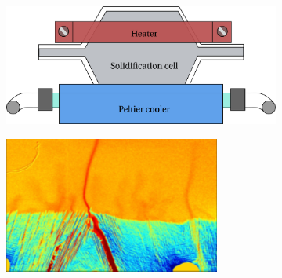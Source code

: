 \begin{figure}[htbp]
\centering
  \begin{subfigure}{0.5\textwidth}
    \centering
	\includegraphics[width=\textwidth]{Chapter4/Graphics/freckle_exp/setup.pdf}
	\caption{}
    \label{fig:experimental_setup}
  \end{subfigure}
  \begin{subfigure}{0.5\textwidth}
    \centering
	\includegraphics[width=\textwidth]{Chapter4/Graphics/freckle_exp/img.png}
	\caption{}
    \label{fig:experimental_img}
  \end{subfigure}
  \begin{subfigure}{0.5\textwidth}
    \centering

\end{subfigure}
\end{figure}

